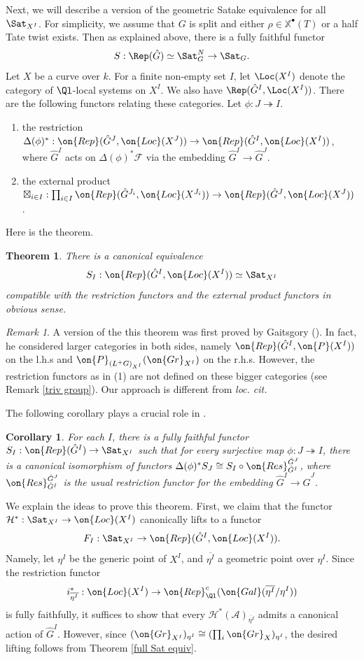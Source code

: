 \documentclass[]{pcmi}
\theoremstyle{plain}
\newtheorem{thm}[equation]{Theorem}
\newtheorem{cor}[equation]{Corollary}
\theoremstyle{remark}
\newtheorem{rmk}[equation]{Remark}
\theoremstyle{definition}
\newcommand{\mA}{{\mathcal A}}
\newcommand{\mF}{{\mathcal F}}
\newcommand{\mH}{{\mathcal H}}
\newcommand{\Gal}{{\on{Gal}}}
\newcommand{\Gr}{{\on{Gr}}}
\newcommand{\Res}{{\on{Res}}}
\def\xch{\mathbb{X}^\bullet}
\begin{document}
Next, we will describe a version of the geometric Satake equivalence for all $\Sat_{X^I}$. For simplicity, we assume that $G$ is split and either $\rho\in \xch(T)$ or a half Tate twist exists. Then as explained above, there is a fully faithful functor
\[S: \Rep(\hat G)\simeq \Sat_G^N\to \Sat_G.\]
Let $X$ be a curve over $k$. For a finite non-empty set $I$, let $\Loc(X^I)$ denote the category of $\Ql$-local systems on $X^I$. We also have $\Rep(\hat G^I,\Loc(X^I))$.
There are the following functors relating these categories. Let $\phi:J\twoheadrightarrow I$.
\begin{enumerate}
\item[(i)] the restriction $\Delta(\phi)^*: \on{Rep}(\hat G^J,{\on{Loc}(X^J)})\to \on{Rep}(\hat G^I, {\on{Loc}(X^I)})$, where $\hat G^I$ acts on $\Delta(\phi)^*\mF$ via the embedding $\hat G^I\to \hat G^J$.
\item[(ii)] the external product $\boxtimes_{i\in I}:\prod_{i\in I} \on{Rep}(\hat G^{J_i},{\on{Loc}(X^{J_i})})\to \on{Rep}(\hat G^J,\on{Loc}(X^J))$.
\end{enumerate}


Here is the theorem. 
\begin{thm}\label{multiple point Sat}
There is a canonical equivalence 
\[S_I: \on{Rep}(\hat G^I, \on{Loc}(X^I))\simeq \Sat_{X^I}\]
compatible with the restriction functors and the external product functors in obvious sense.
\end{thm}
\begin{rmk}
A version of the this theorem was first proved by Gaitsgory (\cite{Ga2}). In fact, he considered larger categories in both sides, namely $\on{Rep}(\hat G^I, \on{P}(X^I))$ on the l.h.s and $\on{P}_{(L^+G)_{X^I}}(\Gr_{X^I})$ on the r.h.s. However, the restriction functors as in (1) are not defined on these bigger categories (see Remark \ref{triv group}). Our approach is different from \emph{loc. cit.}
\end{rmk}
The following corollary plays a crucial role in \cite{Laf}.
\begin{cor}For each $I$, there is a fully faithful functor $S_I: \on{Rep}(\hat G^I)\to \Sat_{X^I}$ such that for every surjective map $\phi: J\twoheadrightarrow I$, there is a canonical isomorphism of functors $\Delta(\phi)^*S_J\cong S_I\circ \Res_{\hat G^I}^{\hat G^J}$, where $\Res_{\hat G^I}^{\hat G^J}$ is the usual restriction functor for the embedding $\hat G^I\to \hat G^J$.
\end{cor}

We explain the ideas to prove this theorem.  
First, we claim that the functor
$\mH^* :\Sat_{X^I}\to \on{Loc}(X^I)$
canonically lifts to a functor $$F_I: \Sat_{X^I}\to \on{Rep}(\hat G^I,{\on{Loc}(X^I)}).$$ Namely,
let $\eta^I$ be the generic point of $X^I$, and $\overline{\eta^I}$ a geometric point over $\eta^I$. Since the restriction functor 
$$i_{\overline{\eta^I}}^*: \on{Loc}(X^I)\to \on{Rep}^c_{\Ql}(\Gal(\overline{\eta^I}/\eta^I))$$ 
is fully faithfully, it suffices to show that every $\mH^*(\mA)_{\overline{\eta^I}}$ admits a canonical action of $\hat G^I$. However, since $(\Gr_{X^I})_{\eta^I}\cong (\prod_i \Gr_X)_{\eta^I}$, the desired lifting follows from Theorem \ref{full Sat equiv}. 
\end{document}
